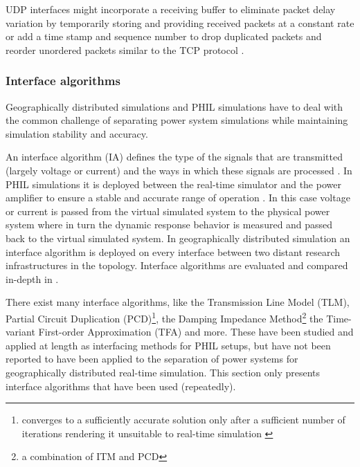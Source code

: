\documentclass[a4paper,ngerman]{atseminar}
\begin{document}
UDP interfaces might incorporate a receiving buffer to eliminate packet delay variation \cite{rfc3393} by temporarily storing and providing received packets at a constant rate or add a time stamp and sequence number to drop duplicated packets and reorder unordered packets similar to the TCP protocol \cite{stevic2017europe}. 

\subsubsection{Interface algorithms}
\label{MH:sec:ia}

Geographically distributed simulations and PHIL simulations have to deal with the common challenge of separating power system simulations while maintaining simulation stability and accuracy.

An interface algorithm (IA) defines the type of the signals that are transmitted (largely voltage or current) and the ways in which these signals are processed \cite{ren2008}. In PHIL simulations it is deployed between the real-time simulator and the power amplifier to ensure a stable and accurate range of operation \cite{montoya2020}. In this case voltage or current is passed from the virtual simulated system to the physical power system where in turn the dynamic response behavior is measured and passed back to the virtual simulated system.
In geographically distributed simulation an interface algorithm is deployed on every interface between two distant research infrastructures in the topology. Interface algorithms are evaluated and compared in-depth in \cite{ren2008, brandl2017}.

There exist many interface algorithms, like the Transmission Line Model (TLM), Partial Circuit Duplication (PCD)\footnote{converges to a sufficiently accurate solution only after a sufficient number of iterations rendering it unsuitable to real-time simulation \cite{ren2008}}, the Damping Impedance Method\footnote{a combination of ITM and PCD} the Time-variant First-order Approximation (TFA) and more. These have been studied and applied at length as interfacing methods for PHIL setups,
but have not been reported to have been applied to the separation of power systems for geographically distributed real-time simulation. This section only presents interface algorithms that have been used (repeatedly).

\end{document}
